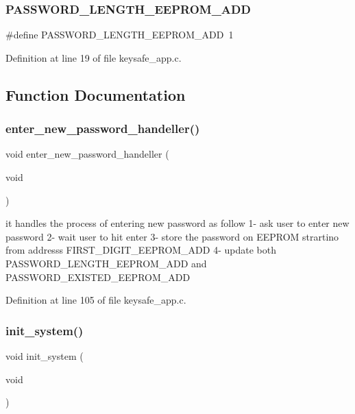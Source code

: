 \subsubsection{P\+A\+S\+S\+W\+O\+R\+D\+\_\+\+L\+E\+N\+G\+T\+H\+\_\+\+E\+E\+P\+R\+O\+M\+\_\+\+A\+DD}
{\footnotesize\ttfamily \#define P\+A\+S\+S\+W\+O\+R\+D\+\_\+\+L\+E\+N\+G\+T\+H\+\_\+\+E\+E\+P\+R\+O\+M\+\_\+\+A\+DD~1}



Definition at line 19 of file keysafe\+\_\+app.\+c.



\subsection{Function Documentation}
\mbox{\label{keysafe__app_8c_aa50e6b544aca867e64ea0045a5043242}} 
\subsubsection{enter\+\_\+new\+\_\+password\+\_\+handeller()}
{\footnotesize\ttfamily void enter\+\_\+new\+\_\+password\+\_\+handeller (\begin{DoxyParamCaption}\item[{void}]{ }\end{DoxyParamCaption})}



it handles the process of entering new password as follow 1-\/ ask user to enter new password 2-\/ wait user to hit enter 3-\/ store the password on E\+E\+P\+R\+OM strartino from addresss F\+I\+R\+S\+T\+\_\+\+D\+I\+G\+I\+T\+\_\+\+E\+E\+P\+R\+O\+M\+\_\+\+A\+DD 4-\/ update both P\+A\+S\+S\+W\+O\+R\+D\+\_\+\+L\+E\+N\+G\+T\+H\+\_\+\+E\+E\+P\+R\+O\+M\+\_\+\+A\+DD and P\+A\+S\+S\+W\+O\+R\+D\+\_\+\+E\+X\+I\+S\+T\+E\+D\+\_\+\+E\+E\+P\+R\+O\+M\+\_\+\+A\+DD 



Definition at line 105 of file keysafe\+\_\+app.\+c.

\mbox{\label{keysafe__app_8c_a348d23d5899ce59d18975284dfb0afc0}} 
\subsubsection{init\+\_\+system()}
{\footnotesize\ttfamily void init\+\_\+system (\begin{DoxyParamCaption}\item[{void}]{ }\end{DoxyParamCaption})}



